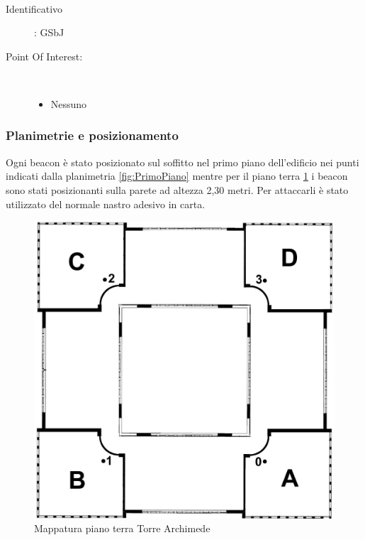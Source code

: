 \documentclass[../SperimentazioniPratiche.tex]{subfiles}
\begin{document}
			\paragraph*{}
			\label{01007}
			\begin{tcolorbox}[fonttitle=\bfseries, 
								adjusted title={\Large Beacon 01007},
								sharp corners=south,
								colback=white, 
								colframe=white!50!blue!75!black]
								
				\begin{description}
					\item[Identificativo]: GSbJ

					\tcbline					
					
					\item[Point Of Interest:] \ \par
					\begin{itemize}
						\item Nessuno
					\end{itemize}					   				
				\end{description}  				
			\end{tcolorbox}
			
		
		
		\newpage
		\subsubsection{Planimetrie e posizionamento}
			Ogni beacon è stato posizionato sul soffitto nel primo piano dell'edificio nei punti indicati dalla planimetria \ref{fig:PrimoPiano} mentre per il piano terra \ref{fig:PianoTerra} i beacon sono stati posizionanti sulla parete ad altezza 2,30 metri. Per attaccarli è stato utilizzato del normale nastro adesivo in carta.
			
			\begin{figure}[h]
				\includegraphics[width=\textwidth]{img/PianoTerra}
				\caption{Mappatura piano terra Torre Archimede}
				\label{fig:PianoTerra}
			\end{figure}						
\end{document}

